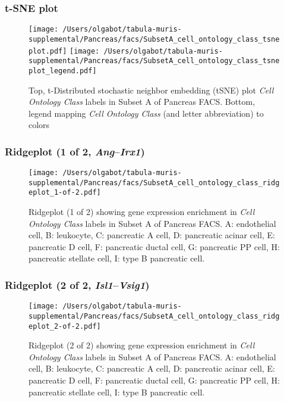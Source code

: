 \clearpage
\subsubsection{t-SNE plot}
\begin{figure}[h]
\centering
\texttt{[image: /Users/olgabot/tabula-muris-supplemental/Pancreas/facs/SubsetA\_cell\_ontology\_class\_tsneplot.pdf]}
\texttt{[image: /Users/olgabot/tabula-muris-supplemental/Pancreas/facs/SubsetA\_cell\_ontology\_class\_tsneplot\_legend.pdf]}
\caption{Top, t-Distributed stochastic neighbor embedding (tSNE) plot  \emph{Cell Ontology Class} labels in Subset A of Pancreas FACS. Bottom, legend mapping \emph{Cell Ontology Class} (and letter abbreviation) to colors}
\end{figure}


\clearpage

\subsubsection{Ridgeplot (1 of 2, \emph{Ang}--\emph{Irx1})}
\begin{figure}[h]
\centering
\texttt{[image: /Users/olgabot/tabula-muris-supplemental/Pancreas/facs/SubsetA\_cell\_ontology\_class\_ridgeplot\_1-of-2.pdf]}

\caption{ Ridgeplot (1 of 2)  showing gene expression enrichment in \emph{Cell Ontology Class} labels in Subset A of Pancreas FACS. A: endothelial cell, B: leukocyte, C: pancreatic A cell, D: pancreatic acinar cell, E: pancreatic D cell, F: pancreatic ductal cell, G: pancreatic PP cell, H: pancreatic stellate cell, I: type B pancreatic cell.}
\end{figure}


\clearpage

\subsubsection{Ridgeplot (2 of 2, \emph{Isl1}--\emph{Vsig1})}
\begin{figure}[h]
\centering
\texttt{[image: /Users/olgabot/tabula-muris-supplemental/Pancreas/facs/SubsetA\_cell\_ontology\_class\_ridgeplot\_2-of-2.pdf]}

\caption{ Ridgeplot (2 of 2)  showing gene expression enrichment in \emph{Cell Ontology Class} labels in Subset A of Pancreas FACS. A: endothelial cell, B: leukocyte, C: pancreatic A cell, D: pancreatic acinar cell, E: pancreatic D cell, F: pancreatic ductal cell, G: pancreatic PP cell, H: pancreatic stellate cell, I: type B pancreatic cell.}
\end{figure}



